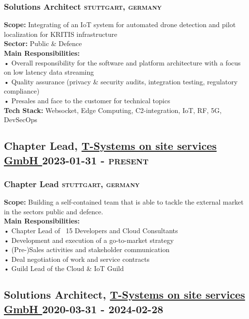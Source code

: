 \documentclass{article}
\newcommand{\rside}[1]{\hfill \normalfont\scshape\MakeLowercase{#1}}
\begin{document}
\subsubsection{ Solutions Architect \rside{ Stuttgart, Germany } }
\begin{flushleft}
\textbf{Scope:} Integrating of an IoT system for automated drone detection and pilot localization for KRITIS infrastructure\\\textbf{Sector:} Public \& Defence\\[1em]\textbf{Main Responsibilities:} \\• Overall responsibility for the software and platform architecture with a focus on low latency data streaming\\• Quality assurance (privacy \& security audits, integration testing, regulatory compliance)\\• Presales and face to the customer for technical topics\\[1em]\textbf{Tech Stack:} Websocket, Edge Computing, C2-integration, IoT, RF, 5G, DevSecOps
\end{flushleft}

\subsection{ Chapter Lead, \href{ https://www.linkedin.com/company/t-systems-on-site-services-gmbh/ }{ T-Systems on site services GmbH } \rside{ 2023-01-31 - PRESENT } }
\subsubsection{ Chapter Lead \rside{ Stuttgart, Germany } }
\begin{flushleft}
\textbf{Scope:} Building a self-contained team that is able to tackle the external market in the sectors public and defence.\\[1em]\textbf{Main Responsibilities:}\\• Chapter Lead of ~15 Developers and Cloud Consultants\\• Development and execution of a go-to-market strategy\\• (Pre-)Sales activities and stakeholder communication\\• Deal negotiation of work and service contracts\\• Guild Lead of the Cloud \& IoT Guild
\end{flushleft}

\subsection{ Solutions Architect, \href{ https://www.linkedin.com/company/t-systems-on-site-services-gmbh/ }{ T-Systems on site services GmbH } \rside{ 2020-03-31 - 2024-02-28 } }
\end{document}
